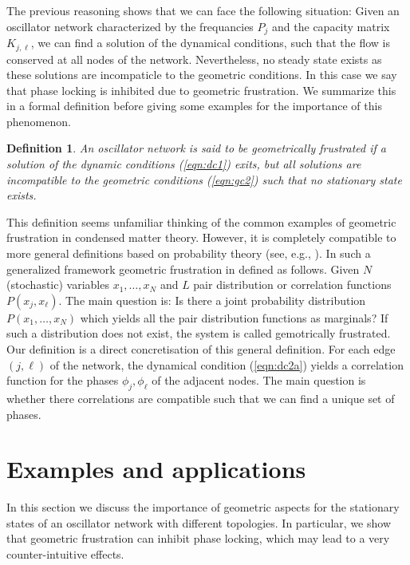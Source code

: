 \documentclass[10pt,aps,pra,twocolumn,superscriptaddress]{revtex4-1}
\newtheorem{defn}[thm]{Definition}
\begin{document}

The previous reasoning shows that we can face the following
situation: Given an oscillator network characterized by the
frequancies $P_j$ and the capacity matrix $K_{j,\ell}$,
we can find a solution of the dynamical conditions, such that
the flow is conserved at all nodes of the network. Nevertheless,
no steady state exists as these solutions are incompaticle 
to the geometric conditions. In this case we say that phase
locking is inhibited due to geometric frustration. We 
summarize this in a formal definition before giving some
examples for the importance of this phenomenon. 


\begin{defn}
An oscillator network is said to be {geometrically 
frustrated} if a solution of the dynamic conditions 
(\ref{eqn:dc1}) exits, but all solutions are incompatible
to the geometric conditions (\ref{eqn:gc2}) such 
that no stationary state exists.
\end{defn}


This definition seems unfamiliar thinking of the common examples 
of geometric frustration in condensed matter theory. However, it is 
completely compatible to more general definitions based on probability
theory (see, e.g., \cite{Wolf03}). In such a generalized framework
geometric frustration in defined as follows.
Given $N$ (stochastic) variables $x_1,\ldots,x_N$ and $L$ pair
distribution or correlation functions $P(x_j,x_\ell)$. The main question 
is: Is there a joint probability distribution $P(x_1,\ldots,x_N)$ which
yields all the pair distribution functions as marginals? If such
a distribution does not exist, the system is called gemotrically
frustrated. Our definition is a direct concretisation of this
general definition. For each edge $(j,\ell)$ of the network, the 
dynamical condition (\ref{eqn:dc2a})  yields a correlation function for the phases
$\phi_j, \phi_\ell$ of the adjacent nodes. The main question is 
whether there correlations are compatible such that we can 
find a unique set of phases.

\section{Examples and applications}

In this section we discuss the importance of geometric aspects 
for the stationary states of an oscillator network with different
topologies. In particular, we show that geometric frustration 
can inhibit phase locking, which may lead to a very 
counter-intuitive effects.
\end{document}
